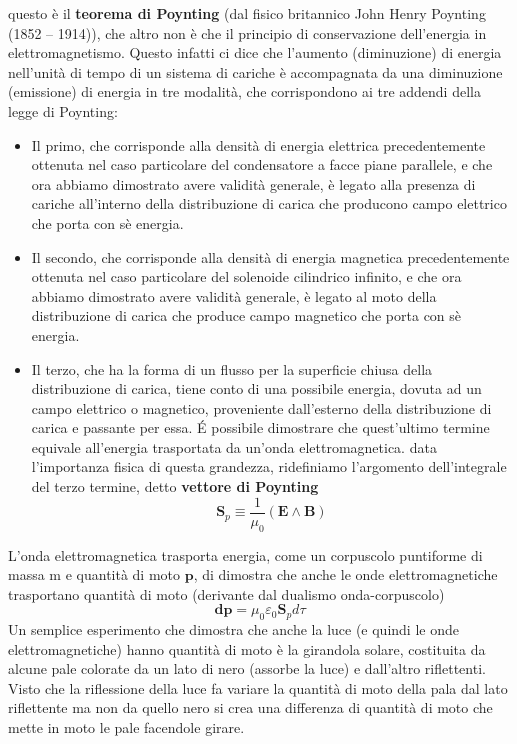 \documentclass[
10pt, %
a4paper, %
oneside, %
headinclude,footinclude, %
BCOR5mm, %
]{scrartcl}
\begin{document}
questo è il \textbf{teorema di Poynting} (dal fisico britannico John Henry Poynting (1852 – 1914)), che altro non è che il principio di conservazione dell'energia in elettromagnetismo. Questo infatti ci dice che l'aumento (diminuzione) di energia nell'unità di tempo di un sistema di cariche è accompagnata da una diminuzione (emissione) di energia in tre modalità, che corrispondono ai tre addendi della legge di Poynting:
\begin{itemize}
	\item Il primo, che corrisponde alla densità di energia elettrica precedentemente ottenuta nel caso particolare del condensatore a facce piane parallele, e che ora abbiamo dimostrato avere validità generale, è legato alla presenza di cariche all'interno della distribuzione di carica che producono campo elettrico che porta con sè energia. 
	\item Il secondo, che corrisponde alla densità di energia magnetica precedentemente ottenuta nel caso particolare del solenoide cilindrico infinito, e che ora abbiamo dimostrato avere validità generale, è legato al moto della distribuzione di carica che produce campo magnetico che porta con sè energia. 
	\item Il terzo, che ha la forma di un flusso per la superficie chiusa della distribuzione di carica, tiene conto di una possibile energia, dovuta ad un campo elettrico o magnetico, proveniente dall'esterno della distribuzione di carica e passante per essa. \'{E} possibile dimostrare che quest'ultimo termine equivale all'energia trasportata da un'onda elettromagnetica. data l'importanza fisica di questa grandezza, ridefiniamo l'argomento dell'integrale del terzo termine, detto \textbf{vettore di Poynting}
	\[\mathbf{S}_p \equiv \frac{1}{\mu_0}(\mathbf{E}\wedge\mathbf{B})\]
\end{itemize}
L'onda elettromagnetica trasporta energia, come un corpuscolo puntiforme di massa m e quantità di moto \(\mathbf{p}\), di dimostra che anche le onde elettromagnetiche trasportano quantità di moto (derivante dal dualismo onda-corpuscolo)
\[\mathbf{dp} = \mu_0\varepsilon_0 \mathbf{S}_p d\tau\]
Un semplice esperimento che dimostra che anche la luce (e quindi le onde elettromagnetiche) hanno quantità di moto è la girandola solare, costituita da alcune pale colorate da un lato di nero (assorbe la luce) e dall'altro riflettenti. Visto che la riflessione della luce fa variare la quantità di moto della pala dal lato riflettente ma non da quello nero si crea una differenza di quantità di moto che mette in moto le pale facendole girare. 
\end{document}
